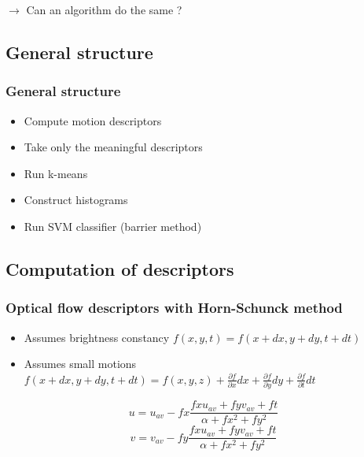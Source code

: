 \documentclass[french]{beamer}
\begin{document}
\begin{frame}
	$\rightarrow$ Can an algorithm do the same ?
	
	\end{frame}
	
	\begin{frame}
	\section{General structure}
	\frametitle{General structure}
	
	\begin{itemize}
		\item Compute motion descriptors
		\item Take only the meaningful descriptors
		\item Run k-means
		\item Construct histograms
		\item Run SVM classifier (barrier method)
	\end{itemize}
	\end{frame}
	
	
	\begin{frame}
		\section {Computation of descriptors}
		\frametitle{Optical flow descriptors with Horn-Schunck method}
		
		\begin{itemize}
			\item Assumes brightness constancy $f(x,y,t) = f(x+dx, y+dy, t+dt)$
			\item Assumes small motions $f(x+dx,y+dy,t+dt) = f(x,y,z) + \frac{\partial f}{\partial x}dx + \frac{\partial f}{\partial y}dy + \frac{\partial f}{\partial t}dt$
		\end{itemize}
		
		\[u = u_{av} - fx\frac{fx u_{av} + fy v_{av} + ft}{\alpha + fx^2 + fy^2}\]
		\[v = v_{av} - fy\frac{fx u_{av} + fy v_{av} + ft}{\alpha + fx^2 + fy^2}\]
	\end{frame}
	
\end{document}
